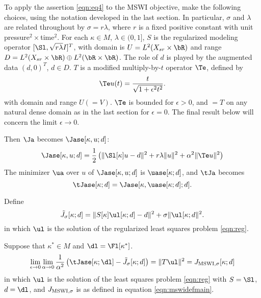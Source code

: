 To apply the assertion \ref{eqn:eq4} to the MSWI objective, make the
following choices, using the notation developed in the last section.
In particular, $\sigma$ and $\lambda$ are related throughout by
$\sigma=r\lambda$, where $r$ is a fixed positive constant with unit
pressure$^2 \times$time$^2$.
For each $\kappa \in M$, $\lambda \in (0,1]$, $S$ is the regularized
modeling operator $[\Sl,\sqrt{r\lambda} I]^T$, with domain is
$U=L^2(X_{sr}\times\bR)$ and range $D =  L^2(X_{sr} \times \bR) \oplus
L^2(\bR \times \bR)$. The role of $d$ is played by the
augmented data $(d,0)^T$, $d \in D$. $T$ is a modified multiply-by-$t$ operator
$\Te$, defined by 
\begin{equation}
  \label{eqn:teps}
  \Te u(t) = \frac{t}{\sqrt{1+\epsilon^2t^2}}.
\end{equation}
with domain and range $U ( = V)$. $\Te$ is bounded for $\epsilon>0$,
and $=T$ on any natural dense domain as in the last section for $\epsilon=0$. The final result below will
concern the limit $\epsilon \rightarrow 0$.

Then $\Ja$ becomes $\Jase[\kappa,u;d]$:
\begin{equation}
  \label{eqn:mswipen}
   \Jase[\kappa,u;d] = \frac{1}{2}\left(\|\Sl[\kappa]u-d\|^2 +
   r\lambda\|u\|^2 + \alpha^2\|\Te u\|^2\right)
 \end{equation}
The minimizer $\ua$ over $u$ of $\Jase[\kappa,u;d]$ is
$\uase[\kappa;d]$, and $\tJa$ becomes
\begin{equation}
  \label{eqn:mswipenred}
  \tJase[\kappa;d] =
  \Jase[\kappa,\uase[\kappa;d];d].
\end{equation}

Define
\begin{equation}
  \label{eqn:tj0def}
  \tilde{J}_{\sigma}[\kappa;d] = \|S[\kappa]\ul[\kappa;d] - d\|^2 + \sigma\|\ul[\kappa;d\|^2.
\end{equation}
in which $\ul$ is the solution of the regularized least squares
problem \ref{eqn:reg}. 

\begin{prop}
  \label{thm:MSWIepsalphalim}
Suppose that $\kappa^* \in M$ and $\dl=\Fl[\kappa^*]$.
\begin{equation}
  \label{eqn:eq7}
  \lim_{\epsilon \rightarrow 0}\lim_{\alpha \rightarrow 0}
  \frac{1}{\alpha^2}\left(\tJase[\kappa;\dl]-\tilde{J}_{\sigma}[\kappa;d]\right)=
 \|T\ul\|^2 =  J_{\rm MSWI,\sigma}[\kappa;d]
\end{equation}
in which $\ul$ is the solution of the least squares problem
\ref{eqn:reg} with $S=\Sl$, $d=\dl$, and $J_{\rm MSWI,\sigma}$ is as
defined in equation \ref{eqn:mswidefmain}.
\end{prop}


